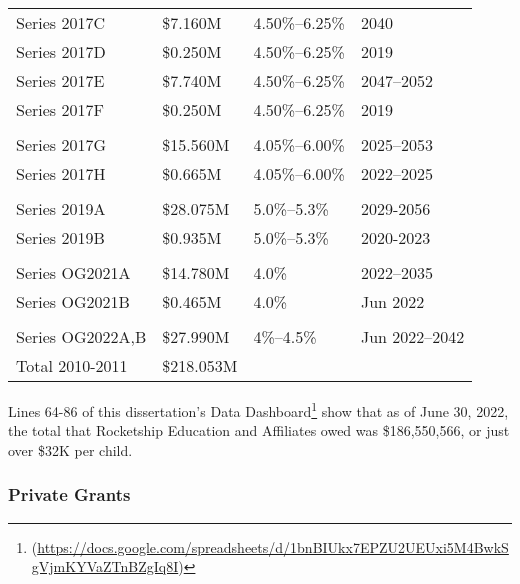 \begin{table}[ht]
\begin{tabular}{llll}
    Series 2017C     & \$7.160M  & 4.50\%–6.25\%  & 2040           \\
    Series 2017D     & \$0.250M  & 4.50\%–6.25\%  & 2019           \\
    Series 2017E     & \$7.740M  & 4.50\%–6.25\%  & 2047–2052      \\
    Series 2017F     & \$0.250M  & 4.50\%–6.25\%  & 2019           \\
                                                                   \\
    Series 2017G     & \$15.560M & 4.05\%–6.00\%  & 2025–2053      \\
    Series 2017H     & \$0.665M  &  4.05\%–6.00\% & 2022–2025      \\
                                                                   \\
    Series 2019A     & \$28.075M & 5.0\%–5.3\%    & 2029-2056      \\
    Series 2019B     & \$0.935M  & 5.0\%–5.3\%    & 2020-2023      \\
                                                                   \\
    Series OG2021A   & \$14.780M & 4.0\%          & 2022–2035      \\
    Series OG2021B   & \$0.465M  & 4.0\%          & Jun 2022       \\
                                                                   \\
    Series OG2022A,B & \$27.990M & 4\%–4.5\%      & Jun 2022–2042  \\
    \midrule
    Total 2010-2011  & \$218.053M                                  \\
    \bottomrule
  \end{tabular}
\end{table}

Lines 64-86 of this dissertation's Data Dashboard\footnote{ (\url{https://docs.google.com/spreadsheets/d/1bnBIUkx7EPZU2UEUxi5M4BwkSgVjmKYVaZTnBZgIq8I})} show that as of June 30, 2022, the total that Rocketship Education and Affiliates owed was \$186,550,566, or just over \$32K per child.

\subsubsection{Private Grants}%
\label{sec:private-grants}\indent%

